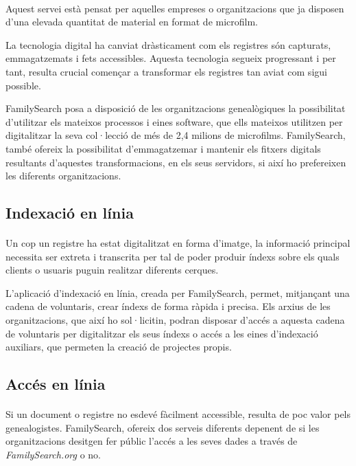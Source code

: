     \paragraph{}
    Aquest servei està pensat per aquelles empreses o organitzacions que ja disposen d’una elevada quantitat de material en format de microfilm.

    La tecnologia digital ha canviat dràsticament com els registres són capturats, emmagatzemats i fets accessibles. Aquesta tecnologia segueix progressant i per tant, resulta crucial començar a transformar els registres tan aviat com sigui possible.

    FamilySearch posa a disposició de les organitzacions genealògiques la possibilitat d’utilitzar els mateixos processos i eines software, que ells mateixos utilitzen per digitalitzar la seva col·lecció de més de 2,4 milions de microfilms. FamilySearch, també ofereix la possibilitat d’emmagatzemar i mantenir els fitxers digitals resultants d'aquestes transformacions, en els seus servidors, si així ho prefereixen les diferents organitzacions.


    \subsection{Indexació en línia}

    \paragraph{}
    Un cop un registre ha estat digitalitzat en forma d’imatge, la informació principal necessita ser extreta i transcrita per tal de poder produir índexs sobre els quals clients o usuaris puguin realitzar diferents cerques.

    L’aplicació d’indexació en línia, creada per FamilySearch, permet, mitjançant una cadena de voluntaris, crear índexs de forma ràpida i precisa. Els arxius de les organitzacions, que així ho sol·licitin, podran disposar d’accés a aquesta cadena de voluntaris per digitalitzar els seus índexs o accés a les eines d’indexació auxiliars, que permeten la creació de projectes propis.


    \subsection{Accés en línia}

    \paragraph{}
    Si un document o registre no esdevé fàcilment accessible, resulta de poc valor pels genealogistes. FamilySearch, ofereix dos serveis diferents depenent de si les or\-ga\-nit\-za\-cions desitgen fer públic l'accés a les seves dades a través de \emph{FamilySearch.org} o no.

